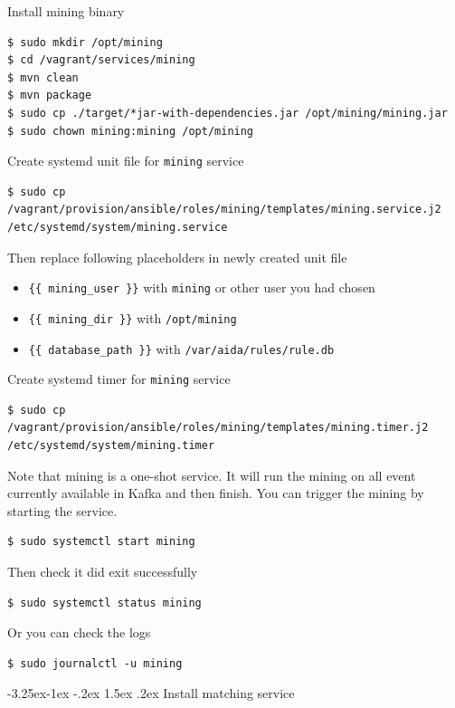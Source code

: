 \documentclass[a4paper]{article} %
\makeatletter
\renewcommand{\normalsize}{\fontsize{12}{15}\selectfont\color{textcolor}}
\renewcommand\subsubsection{\@startsection{subsubsection}{3}{\z@}%
                   {-3.25ex\@plus -1ex \@minus -.2ex}%
                   {1.5ex \@plus .2ex}%
                   {\normalfont\normalsize\sffamily\bfseries\color{projectcolor}}}
\makeatother
\begin{document}
Install mining binary
\begin{lstlisting}
$ sudo mkdir /opt/mining
$ cd /vagrant/services/mining
$ mvn clean
$ mvn package
$ sudo cp ./target/*jar-with-dependencies.jar /opt/mining/mining.jar
$ sudo chown mining:mining /opt/mining
\end{lstlisting}

Create systemd unit file for \texttt{mining} service
\begin{lstlisting}
$ sudo cp /vagrant/provision/ansible/roles/mining/templates/mining.service.j2 /etc/systemd/system/mining.service
\end{lstlisting}

Then replace following placeholders in newly created unit file
\begin{itemize}
\item \texttt{\{\{ mining\_user \}\}} with \texttt{mining} or other user you had chosen
\item \texttt{\{\{ mining\_dir \}\}} with \texttt{/opt/mining}
\item \texttt{\{\{ database\_path \}\}} with \texttt{/var/aida/rules/rule.db}
\end{itemize}

Create systemd timer for \texttt{mining} service
\begin{lstlisting}
$ sudo cp /vagrant/provision/ansible/roles/mining/templates/mining.timer.j2 /etc/systemd/system/mining.timer
\end{lstlisting}

Note that mining is a one-shot service. It will run the mining on all event currently available in Kafka and then finish.
You can trigger the mining by starting the service.
\begin{lstlisting}
$ sudo systemctl start mining
\end{lstlisting}

Then check it did exit successfully
\begin{lstlisting}
$ sudo systemctl status mining
\end{lstlisting}

Or you can check the logs
\begin{lstlisting}
$ sudo journalctl -u mining
\end{lstlisting}


\subsubsection{Install matching service}
\end{document}
